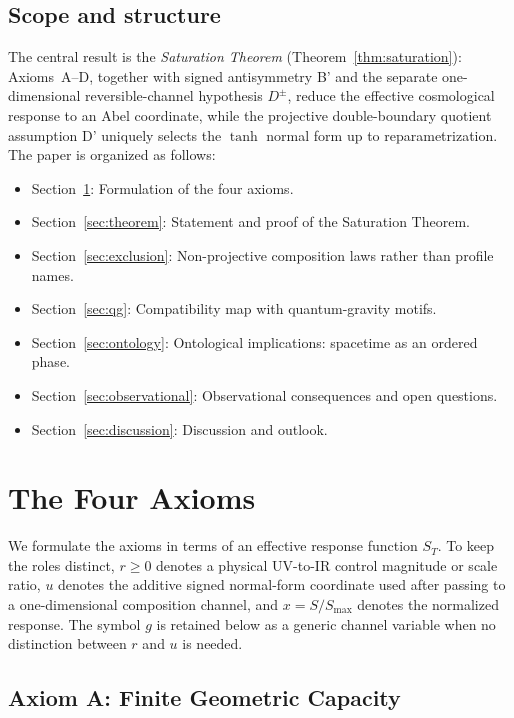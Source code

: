 \documentclass[aps,prd,twocolumn,superscriptaddress,nofootinbib]{revtex4-2}
\begin{document}
\subsection{Scope and structure}

The central result is the \textit{Saturation Theorem} (Theorem~\ref{thm:saturation}): Axioms~A--D, together with signed antisymmetry B' and the separate one-dimensional reversible-channel hypothesis $D^\pm$, reduce the effective cosmological response to an Abel coordinate, while the projective double-boundary quotient assumption D' uniquely selects the $\tanh$ normal form up to reparametrization. The paper is organized as follows:

\begin{itemize}
\item Section~\ref{sec:axioms}: Formulation of the four axioms.
\item Section~\ref{sec:theorem}: Statement and proof of the Saturation Theorem.
\item Section~\ref{sec:exclusion}: Non-projective composition laws rather than profile names.
\item Section~\ref{sec:qg}: Compatibility map with quantum-gravity motifs.
\item Section~\ref{sec:ontology}: Ontological implications: spacetime as an ordered phase.
\item Section~\ref{sec:observational}: Observational consequences and open questions.
\item Section~\ref{sec:discussion}: Discussion and outlook.
\end{itemize}


\section{The Four Axioms}
\label{sec:axioms}

We formulate the axioms in terms of an effective response function $S_T$. To keep the roles distinct, $r\geq0$ denotes a physical UV-to-IR control magnitude or scale ratio, $u$ denotes the additive signed normal-form coordinate used after passing to a one-dimensional composition channel, and $x=S/S_{\max}$ denotes the normalized response. The symbol $g$ is retained below as a generic channel variable when no distinction between $r$ and $u$ is needed.

\subsection{Axiom A: Finite Geometric Capacity}
\end{document}
